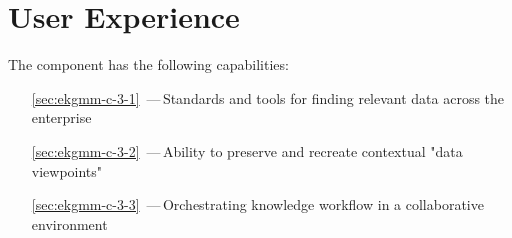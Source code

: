 \chapter{User Experience}\label{ch:ekg-mm-c-3}

The  component has the following capabilities:

\begin{itemize}[leftmargin=.5in]
  \item [\ref{sec:ekgmm-c-3-1}] \,---\,Standards and tools for finding relevant data across the enterprise
  \item [\ref{sec:ekgmm-c-3-2}] \,---\,Ability to preserve and recreate contextual "data viewpoints"
  \item [\ref{sec:ekgmm-c-3-3}] \,---\,Orchestrating knowledge workflow in a collaborative environment
\end{itemize}





